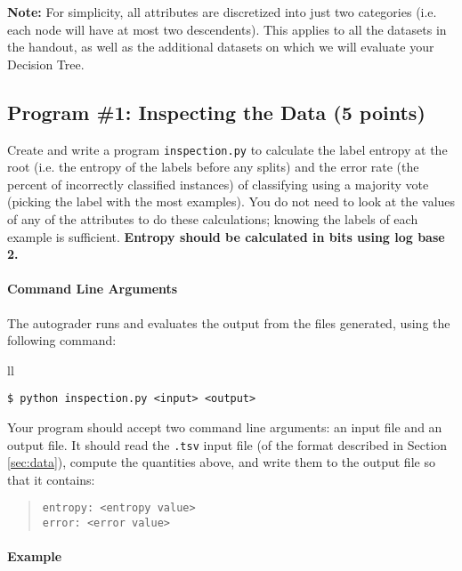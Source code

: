 \documentclass[11pt,addpoints,answers]{exam}
\begin{document}
\begin{notebox} \textbf{Note:}
For simplicity, all attributes are discretized into just two categories (i.e. each node will have at most two descendents). This applies to all the datasets in the handout, as well as the additional datasets on which we will evaluate your Decision Tree.
\end{notebox}

\subsection{Program \#1: Inspecting the Data (5 points)}
\label{sec:inspect}

    Create and write a program \texttt{inspection.py} to calculate the label entropy at the root (i.e. the entropy of the labels before any splits) and the error rate (the percent of incorrectly classified instances) of classifying using a majority vote (picking the label with the most examples). You do not need to look at the values of any of the attributes to do these calculations; knowing the labels of each example is sufficient. \textbf{Entropy should be calculated in bits using log base 2.}

\paragraph{Command Line Arguments}
The autograder runs and evaluates the output from the files  generated, using the following command:

\begin{tabular}{ll}
\begin{lstlisting}[language=Shell]
$ python inspection.py <input> <output>
\end{lstlisting}
\end{tabular}

Your program should accept two command line arguments: an input file and an output file. It should read the \lstinline{.tsv} input file (of the format described in Section \ref{sec:data}), compute the quantities above, and write them to the output file so that it contains:
\begin{quote}
\begin{verbatim}
entropy: <entropy value>
error: <error value>
\end{verbatim}
\end{quote}

\paragraph{Example}
\end{document}
